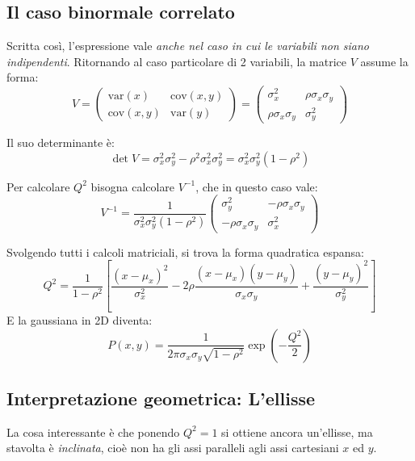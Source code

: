 \documentclass[openany,a4paper,12pt]{book}
\theoremstyle{remark}
\begin{document}
\subsection*{Il caso binormale correlato}
Scritta così, l'espressione vale \emph{anche nel caso in cui le variabili non siano indipendenti}. Ritornando al caso particolare di 2 variabili, la matrice $V$ assume la forma:
\begin{equation}
V = \begin{pmatrix}
\text{var}(x) & \text{cov}(x,y) \\
\text{cov}(x,y) & \text{var}(y)
\end{pmatrix} = \begin{pmatrix}
\sigma_x^2 & \rho \sigma_x \sigma_y \\
\rho \sigma_x \sigma_y & \sigma_y^2
\end{pmatrix}
\end{equation}

Il suo determinante è:
\begin{equation}
\det V = \sigma_x^2 \sigma_y^2 - \rho^2 \sigma_x^2 \sigma_y^2 = \sigma_x^2 \sigma_y^2 (1 - \rho^2)
\end{equation}

Per calcolare $Q^2$ bisogna calcolare $V^{-1}$, che in questo caso vale:
\begin{equation}
V^{-1} = \frac{1}{\sigma_x^2\sigma_y^2(1-\rho^2)} \begin{pmatrix}
\sigma_y^2 & -\rho\sigma_x\sigma_y \\
-\rho\sigma_x\sigma_y & \sigma_x^2
\end{pmatrix}
\end{equation}

Svolgendo tutti i calcoli matriciali, si trova la forma quadratica espansa:
\begin{equation}
Q^2 = \frac{1}{1-\rho^2} \left[ \frac{(x-\mu_x)^2}{\sigma_x^2} - 2\rho\frac{(x-\mu_x)(y-\mu_y)}{\sigma_x\sigma_y} + \frac{(y-\mu_y)^2}{\sigma_y^2} \right]
\end{equation}
E la gaussiana in 2D diventa:
\begin{equation}
P(x,y) = \frac{1}{2\pi\sigma_x\sigma_y\sqrt{1-\rho^2}} \exp\left(-\frac{Q^2}{2}\right)
\end{equation}

\subsection*{Interpretazione geometrica: L'ellisse}
La cosa interessante è che ponendo $Q^2 = 1$ si ottiene ancora un'ellisse, ma stavolta è \emph{inclinata}, cioè non ha gli assi paralleli agli assi cartesiani $x$ ed $y$.
\end{document}
